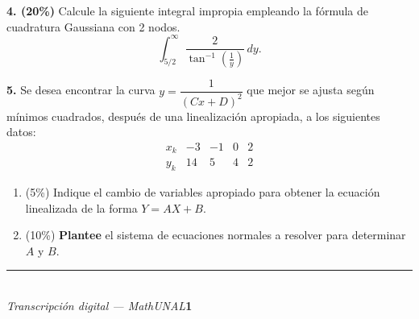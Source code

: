\documentclass[11pt]{article}
\begin{document}
\vspace{5mm}
\noindent\textbf{4. (20\%)} Calcule la siguiente integral impropia empleando la fórmula de cuadratura Gaussiana con 2 nodos.
\[
\int_{5/2}^{\infty} \frac{2}{\tan^{-1}\left(\frac1y\right)}\,dy.
\]

\vspace{5mm}
\noindent\textbf{5.} Se desea encontrar la curva $y=\dfrac1{(Cx+D)^2}$ que mejor se ajusta según mínimos cuadrados, después de una linealización apropiada, a los siguientes datos:
\[
\begin{array}{c|c|c|c|c}
x_k & -3 & -1 & 0 & 2\\ \hline
y_k & 14 & 5 & 4 & 2
\end{array}
\]
\begin{enumerate}
\item[a.] (5\%) Indique el cambio de variables apropiado para obtener la ecuación linealizada de la forma $Y=AX+B$.
\item[b.] (10\%) \textbf{Plantee} el sistema de ecuaciones normales a resolver para determinar $A$ y $B$.
\end{enumerate}

\vfill
\rule{\linewidth}{0.4pt}\\[1pt]
{\scriptsize\textit{Transcripción digital --- MathUNAL}\hfill\textcolor{unalblue}{\textbf{1}}}
\end{document}
